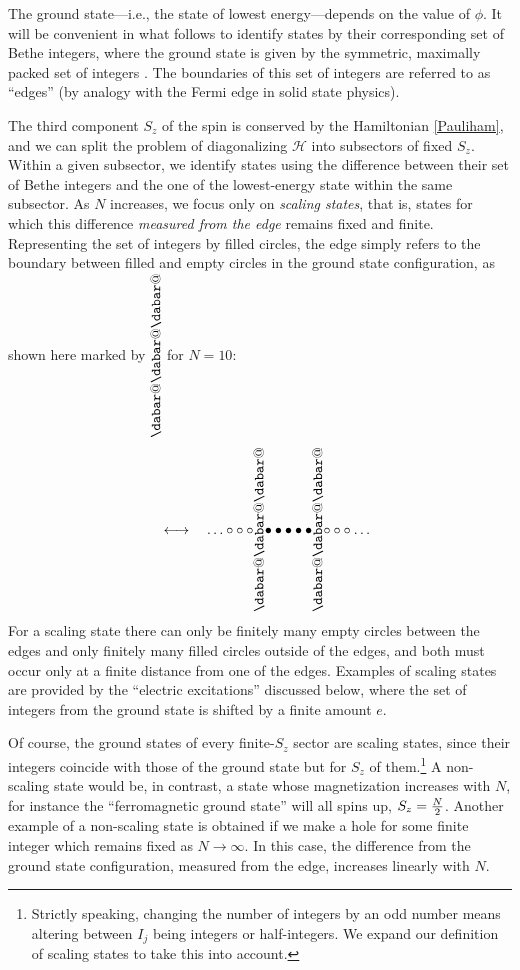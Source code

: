 \documentclass[a4paper,10pt]{article}
\makeatletter
\newcommand{\hubert}[1]{$\framebox{\tiny h}$\ \textbf{\texttt{{\color{blue}\footnotesize#1}}}}
\newcommand{\linnea}[1]{$\framebox{\tiny L}$\ \textbf{\texttt{{\color{red}\footnotesize#1}}}}
\newcommand*\dashline{\rotatebox[origin=c]{90}{$\dabar@\dabar@\dabar@$}}
\makeatother
\begin{document}
The ground state---i.e., the state of lowest energy---depends on the value of $\phi$. It will be convenient in what follows to identify states by their corresponding set of Bethe integers, where the ground state is given by the symmetric, maximally packed set of integers \cite{Alcaraz}. The boundaries of this set of integers are referred to as ``edges'' (by analogy with the Fermi edge in solid state physics).


The third component $S_z$ of the spin is conserved by the Hamiltonian \eqref{Pauliham}, and we can split the problem of diagonalizing ${\mathcal H}$ into subsectors of fixed $S_z$. Within a given subsector, we identify states using the difference between their set of Bethe integers and the one of the lowest-energy state within the same subsector. As $N$ increases, we focus only on {\sl scaling states}, that is,  states for which this difference {\sl measured from the edge} remains fixed and finite. Representing  the set of integers by filled circles, the edge simply refers to the boundary between filled and empty circles in the ground state configuration, as shown here marked by $\dashline$ for $N=10$:
\begin{equation*}
  [-2,-1,0,1,2]  \quad \longleftrightarrow \quad \hdots\circ\circ\circ \hspace*{-2pt}\dashline\hspace*{-2pt}   \bullet\bullet\bullet\bullet\bullet \hspace*{-2pt}\dashline\hspace*{-2pt}  \circ\circ\circ\hdots 
\end{equation*}
For a scaling state there can only be finitely many empty circles between the edges and only finitely many filled circles outside of the edges, and both must occur only at a finite distance from one of the edges.  Examples of scaling states are provided by  the ``electric excitations'' discussed below, where the set of integers from the ground state is shifted by a finite amount $e$. 



Of course, the ground states of every finite-$S_z$ sector are scaling states, since their integers coincide with those of the ground state but for $S_z$ of them.\footnote{Strictly speaking, changing the number of integers by an odd number means altering between $I_j$ being integers or half-integers. We expand our definition of scaling states to take this into account.}  A non-scaling state would be, in contrast, a state whose magnetization increases with $N$, for instance the ``ferromagnetic ground state'' will all spins up, $S_z={N\over 2}$. Another example of a non-scaling state is obtained if we make a hole for some finite integer which remains fixed as $N\to\infty$. In this case, the difference from the ground state configuration, measured from the edge, increases linearly with $N$. 
\end{document}
